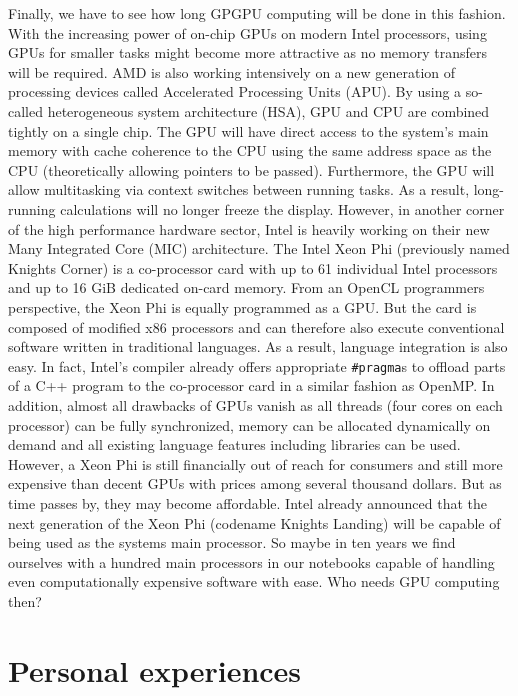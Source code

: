Finally, we have to see how long GPGPU computing will be done in this fashion. With the increasing power of on-chip GPUs on modern Intel processors, using GPUs for smaller tasks might become more attractive as no memory transfers will be required. AMD is also working intensively on a new generation of processing devices called Accelerated Processing Units (APU). By using a so-called heterogeneous system architecture (HSA), GPU and CPU are combined tightly on a single chip. The GPU will have direct access to the system's main memory with cache coherence to the CPU using the same address space as the CPU (theoretically allowing pointers to be passed). Furthermore, the GPU will allow multitasking via context switches between running tasks. As a result, long-running calculations will no longer freeze the display.
However, in another corner of the high performance hardware sector, Intel is heavily working on their new Many Integrated Core (MIC) architecture. The Intel Xeon Phi (previously named Knights Corner) is a co-processor card with up to 61 individual Intel processors and up to 16 GiB dedicated on-card memory. From an OpenCL programmers perspective, the Xeon Phi is equally programmed as a GPU. But the card is composed of modified x86 processors and can therefore also execute conventional software written in traditional languages. As a result, language integration is also easy. In fact, Intel's compiler already offers appropriate \lstinline!#pragma!s to offload parts of a C++ program to the co-processor card in a similar fashion as OpenMP. In addition, almost all drawbacks of GPUs vanish as all threads (four cores on each processor) can be fully synchronized, memory can be allocated dynamically on demand and all existing language features including libraries can be used. However, a Xeon Phi is still financially out of reach for consumers and still more expensive than decent GPUs with prices among several thousand dollars. But as time passes by, they may become affordable. Intel already announced that the next generation of the Xeon Phi (codename Knights Landing) will be capable of being used as the systems main processor. So maybe in ten years we find ourselves with a hundred main processors in our notebooks capable of handling even computationally expensive software with ease. Who needs GPU computing then?

\section{Personal experiences}

